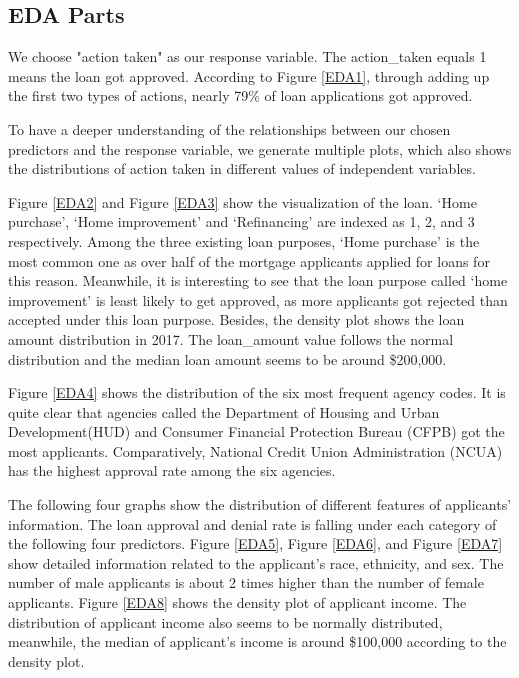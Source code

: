 \documentclass{jpp}
\begin{document}
\subsection{EDA Parts}

We choose "action taken" as our response variable. The action\_taken equals 1 means the loan got approved. According to Figure \ref{EDA1}, through adding up the first two types of actions, nearly 79\% of loan applications got approved.

To have a deeper understanding of the relationships between our chosen predictors and the response variable, we generate multiple plots, which also shows the distributions of action taken in different values of independent variables. 

Figure \ref{EDA2} and Figure \ref{EDA3} show the visualization of the loan. ‘Home purchase’, ‘Home improvement’ and ‘Refinancing’ are indexed as 1, 2, and 3 respectively. Among the three existing loan purposes, ‘Home purchase’ is the most common one as over half of the mortgage applicants applied for loans for this reason. Meanwhile, it is interesting to see that the loan purpose called  ‘home improvement’ is least likely to get approved, as more applicants got rejected than accepted under this loan purpose. Besides, the density plot shows the loan amount distribution in 2017. The loan\_amount value follows the normal distribution and the median loan amount seems to be around \$200,000. 

Figure \ref{EDA4} shows the distribution of the six most frequent agency codes. It is quite clear that agencies called the Department of Housing and Urban Development(HUD) and Consumer Financial Protection Bureau (CFPB) got the most applicants. Comparatively, National Credit Union Administration (NCUA) has the highest approval rate among the six agencies.

The following four graphs show the distribution of different features of applicants’ information.  The loan approval and denial rate is falling under each category of the following four predictors.  Figure \ref{EDA5}, Figure \ref{EDA6}, and Figure \ref{EDA7} show detailed information related to the applicant's race, ethnicity, and sex. The number of male applicants is about 2 times higher than the number of female applicants. Figure \ref{EDA8} shows the density plot of applicant income. The distribution of applicant income also seems to be normally distributed, meanwhile, the median of applicant’s income is around \$100,000 according to the density plot.
\end{document}
